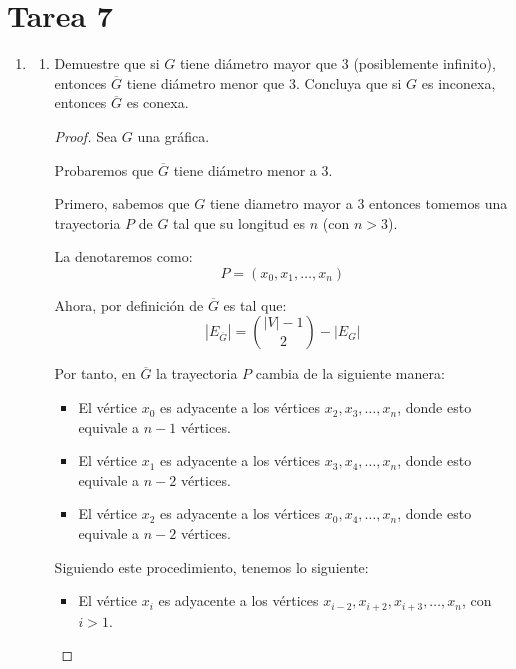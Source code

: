 \documentclass{article}
\begin{document}
\section*{\LARGE{Tarea 7}}
\begin{enumerate}
  \item \begin{enumerate}
    \item Demuestre que si $G$ tiene di\'ametro mayor que $3$ (posiblemente
      infinito), entonces $\overline{G}$ tiene di\'ametro menor que $3$.
      Concluya que si $G$ es inconexa, entonces $\overline{G}$ es conexa.

      \begin{proof}
        Sea $G$ una gráfica.

        Probaremos que $\overline{G}$ tiene diámetro menor a $3$.

        Primero, sabemos que $G$ tiene diametro mayor a $3$ entonces tomemos una trayectoria $P$ de $G$ tal que su longitud es $n$ (con $n > 3$).

        La denotaremos como:
        $$P = (x_{0}, x_{1}, \dots, x_{n})$$

        Ahora, por definición de $\overline{G}$ es tal que:
        $$|E_{\overline{G}}| = \binom{|V| - 1}{2} - |E_{G}|$$

        Por tanto, en $\overline{G}$ la trayectoria $P$ cambia de la siguiente manera:
        \begin{itemize}
          \item El vértice $x_{0}$ es adyacente a los vértices $x_{2}, x_{3}, \dots, x_{n}$, donde esto equivale a $n - 1$ vértices.

          \item El vértice $x_{1}$ es adyacente a los vértices $x_{3}, x_{4}, \dots, x_{n}$, donde esto equivale a $n - 2$ vértices.

          \item El vértice $x_{2}$ es adyacente a los vértices $x_{0}, x_{4}, \dots, x_{n}$, donde esto equivale a $n - 2$ vértices.
        \end{itemize}

        Siguiendo este procedimiento, tenemos lo siguiente:
        \begin{itemize}
          \item El vértice $x_{i}$ es adyacente a los vértices $x_{i-2}, x_{i+2}, x_{i+3}, \dots, x_{n}$, con $i > 1$. 
        \end{itemize}


\end{proof}
\end{enumerate}
\end{enumerate}
\end{document}
